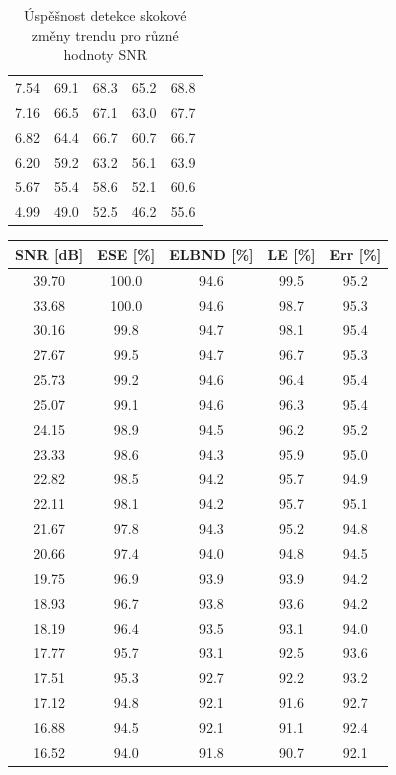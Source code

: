 \documentclass[11pt,twoside,openright]{report}
\begin{document}
\begin{appendices}
\begin{table}[!h]
\begin{center}
\begin{tabular}{|c|c|c|c|c|}
7.54 & 69.1 & 68.3 & 65.2 & 68.8 \\ 
7.16 & 66.5 & 67.1 & 63.0 & 67.7 \\ 
6.82 & 64.4 & 66.7 & 60.7 & 66.7 \\ 
6.20 & 59.2 & 63.2 & 56.1 & 63.9 \\ 
5.67 & 55.4 & 58.6 & 52.1 & 60.6 \\ 
4.99 & 49.0 & 52.5 & 46.2 & 55.6 \\ 
\hline
\end{tabular}
\caption{Úspěšnost detekce skokové změny trendu pro různé hodnoty SNR}
\label{tab:trend}
\end{center}
\end{table}


\begin{table}[h]
\begin{center}
\begin{tabular}{|c|c|c|c|c|}
\hline
\textbf{SNR [dB]} & \textbf{ESE [\%]} & \textbf{ELBND [\%]} & \textbf{LE [\%]} & \textbf{Err [\%]} \\ 
\hline
39.70 & 100.0 & 94.6 & 99.5 & 95.2 \\ 
33.68 & 100.0 & 94.6 & 98.7 & 95.3 \\ 
30.16 & 99.8 & 94.7 & 98.1 & 95.4 \\ 
27.67 & 99.5 & 94.7 & 96.7 & 95.3 \\ 
25.73 & 99.2 & 94.6 & 96.4 & 95.4 \\ 
25.07 & 99.1 & 94.6 & 96.3 & 95.4 \\ 
24.15 & 98.9 & 94.5 & 96.2 & 95.2 \\ 
23.33 & 98.6 & 94.3 & 95.9 & 95.0 \\ 
22.82 & 98.5 & 94.2 & 95.7 & 94.9 \\ 
22.11 & 98.1 & 94.2 & 95.7 & 95.1 \\ 
21.67 & 97.8 & 94.3 & 95.2 & 94.8 \\ 
20.66 & 97.4 & 94.0 & 94.8 & 94.5 \\ 
19.75 & 96.9 & 93.9 & 93.9 & 94.2 \\ 
18.93 & 96.7 & 93.8 & 93.6 & 94.2 \\ 
18.19 & 96.4 & 93.5 & 93.1 & 94.0 \\ 
17.77 & 95.7 & 93.1 & 92.5 & 93.6 \\ 
17.51 & 95.3 & 92.7 & 92.2 & 93.2 \\ 
17.12 & 94.8 & 92.1 & 91.6 & 92.7 \\ 
16.88 & 94.5 & 92.1 & 91.1 & 92.4 \\ 
16.52 & 94.0 & 91.8 & 90.7 & 92.1 \\ 

\end{tabular}
\end{center}
\end{table}
\end{appendices}
\end{document}
